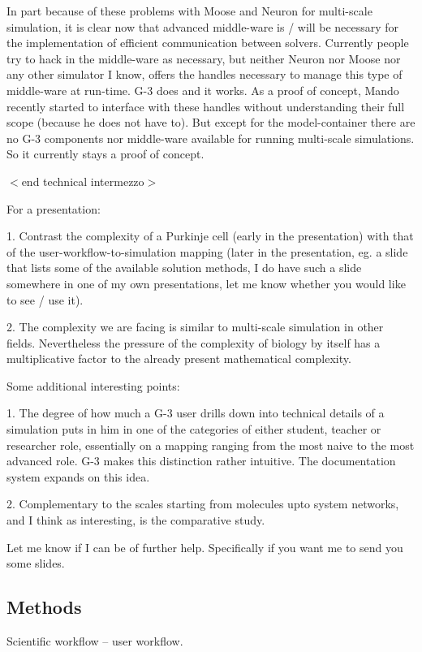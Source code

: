 \documentclass[12pt]{article}
\begin{document}
In part because of these problems with Moose and Neuron for
multi-scale simulation, it is clear now that advanced middle-ware is /
will be necessary for the implementation of efficient communication
between solvers.  Currently people try to hack in the middle-ware as
necessary, but neither Neuron nor Moose nor any other simulator I
know, offers the handles necessary to manage this type of middle-ware
at run-time.  G-3 does and it works.  As a proof of concept, Mando
recently started to interface with these handles without understanding
their full scope (because he does not have to).  But except for the
model-container there are no G-3 components nor middle-ware available
for running multi-scale simulations.  So it currently stays a proof of
concept.

$<$end technical intermezzo$>$

For a presentation:

1. Contrast the complexity of a Purkinje cell (early in the
presentation) with that of the user-workflow-to-simulation mapping
(later in the presentation, eg. a slide that lists some of the
available solution methods, I do have such a slide somewhere in one of
my own presentations, let me know whether you would like to see / use
it).

2. The complexity we are facing is similar to multi-scale simulation
in other fields.  Nevertheless the pressure of the complexity of
biology by itself has a multiplicative factor to the already present
mathematical complexity.

Some additional interesting points:

1. The degree of how much a G-3 user drills down into technical
details of a simulation puts in him in one of the categories of either
student, teacher or researcher role, essentially on a mapping ranging
from the most naive to the most advanced role.  G-3 makes this
distinction rather intuitive.  The documentation system expands on
this idea.

2. Complementary to the scales starting from molecules upto system
networks, and I think as interesting, is the comparative study.

Let me know if I can be of further help.  Specifically if you want me
to send you some slides.

\subsection*{Methods}

Scientific workflow -- user workflow.
\end{document}
